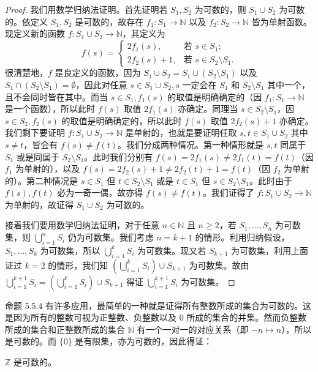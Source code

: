 \begin{proof}
我们用数学归纳法证明。首先证明若 $S_1, S_2$ 为可数的，则 $S_1 \cup S_2$ 为可数的。依定义 $S_1, S_2$ 是可数的，故存在 $f_1 : S_1 \to \mathbb{N}$ 以及 $f_2 : S_2 \to \mathbb{N}$ 皆为单射函数。现定义新的函数 $f : S_1 \cup S_2 \to \mathbb{N}$，其定义为
$$ f(s) = \begin{cases} 2f_1(s), & \text{若 } s \in S_1; \\ 2f_2(s) + 1, & \text{若 } s \in S_2 \setminus S_1. \end{cases} $$
很清楚地，$f$ 是良定义的函数，因为 $S_1 \cup S_2 = S_1 \cup (S_2 \setminus S_1)$ 以及 $S_1 \cap (S_2 \setminus S_1) = \emptyset$，因此对任意 $s \in S_1 \cup S_2, s$ 一定会在 $S_1$ 和 $S_2 \setminus S_1$ 其中一个，且不会同时皆在其中。而当 $s \in S_1, f_1(s)$ 的取值是明确确定的（因 $f_1 : S_1 \to \mathbb{N}$ 是一个函数），所以此时 $f(s)$ 取值 $2f_1(s)$ 亦确定。同理当 $s \in S_2 \setminus S_1$，因 $s \in S_2, f_2(s)$ 的取值是明确确定的，所以此时 $f(s)$ 取值 $2f_2(s) + 1$ 亦确定。我们剩下要证明 $f : S_1 \cup S_2 \to \mathbb{N}$ 是单射的，也就是要证明任取 $s, t \in S_1 \cup S_2$ 其中 $s \neq t$，皆会有 $f(s) \neq f(t)$。我们分成两种情况。第一种情形就是 $s, t$ 同属于 $S_1$ 或是同属于 $S_2 \setminus S_1$。此时我们分别有 $f(s) = 2f_1(s) \neq 2f_1(t) = f(t)$（因 $f_1$ 为单射的），以及 $f(s) = 2f_2(s) + 1 \neq 2f_2(t) + 1 = f(t)$（因 $f_2$ 为单射的）。第二种情况是 $s \in S_1$ 但 $t \in S_2 \setminus S_1$ 或是 $t \in S_1$ 但 $s \in S_2 \setminus S_1$。此时由于 $f(s), f(t)$ 必为一奇一偶，故亦得 $f(s) \neq f(t)$。我们证得了 $f : S_1 \cup S_2 \to \mathbb{N}$ 为单射的，故证得 $S_1 \cup S_2$ 为可数的。

接着我们要用数学归纳法证明，对于任意 $n \in \mathbb{N}$ 且 $n \geq 2$，若 $S_1, \dots, S_n$ 为可数集，则 $\bigcup_{i=1}^n S_i$ 仍为可数集。我们考虑 $n = k + 1$ 的情形。利用归纳假设，$S_1, \dots, S_k$ 为可数集，所以 $\bigcup_{i=1}^k S_i$ 为可数集。现又若 $S_{k+1}$ 为可数集，利用上面证过 $k = 2$ 的情形，我们知 $(\bigcup_{i=1}^k S_i) \cup S_{k+1}$ 为可数集。故由 $\bigcup_{i=1}^{k+1} S_i = (\bigcup_{i=1}^k S_i) \cup S_{k+1}$ 得证 $\bigcup_{i=1}^{k+1} S_i$ 为可数集。
\end{proof}

命题 5.5.4 有许多应用，最简单的一种就是证得所有整数所成的集合为可数的。这是因为所有的整数可视为正整数、负整数以及 0 所成的集合的并集。然而负整数所成的集合和正整数所成的集合 $\mathbb{N}$ 有一个一对一的对应关系（即 $-n \mapsto n$），所以是可数的。而 $\{0\}$ 是有限集，亦为可数的，因此得证：

\begin{corollary}
$\mathbb{Z}$ 是可数的。
\end{corollary}

